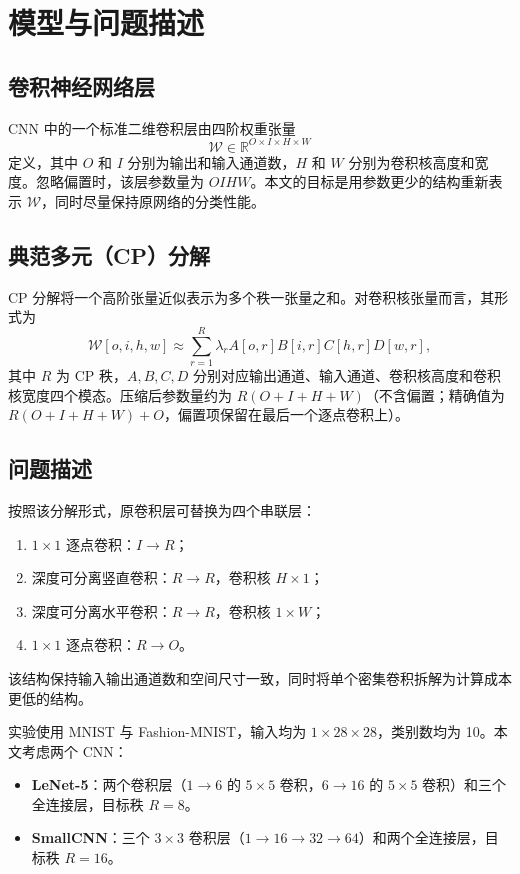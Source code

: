 \documentclass[11pt,a4paper,fontset=fandol]{ctexart}
\begin{document}
\section{模型与问题描述}
\subsection{卷积神经网络层}
CNN 中的一个标准二维卷积层由四阶权重张量
\[
\mathcal{W}\in\mathbb{R}^{O\times I\times H\times W}
\]
定义，其中 $O$ 和 $I$ 分别为输出和输入通道数，$H$ 和 $W$ 分别为卷积核高度和宽度。忽略偏置时，该层参数量为 $O I H W$。本文的目标是用参数更少的结构重新表示 $\mathcal{W}$，同时尽量保持原网络的分类性能。

\subsection{典范多元（CP）分解}
CP 分解将一个高阶张量近似表示为多个秩一张量之和。对卷积核张量而言，其形式为
\begin{equation}
\mathcal{W}[o,i,h,w]\approx\sum_{r=1}^{R}\lambda_r A[o,r]B[i,r]C[h,r]D[w,r],
\end{equation}
其中 $R$ 为 CP 秩，$A,B,C,D$ 分别对应输出通道、输入通道、卷积核高度和卷积核宽度四个模态。压缩后参数量约为 $R(O+I+H+W)$（不含偏置；精确值为 $R(O+I+H+W)+O$，偏置项保留在最后一个逐点卷积上）。

\subsection{问题描述}
按照该分解形式，原卷积层可替换为四个串联层：
\begin{enumerate}
  \item $1\times1$ 逐点卷积：$I\to R$；
  \item 深度可分离竖直卷积：$R\to R$，卷积核 $H\times1$；
  \item 深度可分离水平卷积：$R\to R$，卷积核 $1\times W$；
  \item $1\times1$ 逐点卷积：$R\to O$。
\end{enumerate}
该结构保持输入输出通道数和空间尺寸一致，同时将单个密集卷积拆解为计算成本更低的结构。

实验使用 MNIST 与 Fashion-MNIST，输入均为 $1\times28\times28$，类别数均为 10。本文考虑两个 CNN：
\begin{itemize}
  \item \textbf{LeNet-5}：两个卷积层（$1\to6$ 的 $5\times5$ 卷积，$6\to16$ 的 $5\times5$ 卷积）和三个全连接层，目标秩 $R=8$。
  \item \textbf{SmallCNN}：三个 $3\times3$ 卷积层（$1\to16\to32\to64$）和两个全连接层，目标秩 $R=16$。
\end{itemize}
\end{document}
